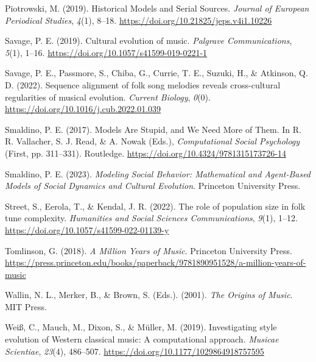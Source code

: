 \documentclass[
  a4paperpaper,
  ,captions=tableheading
]{scrbook}
\newlength{\cslhangindent}
\newlength{\cslentryspacingunit} %
\newenvironment{CSLReferences}[2] %
 {%
  \setlength{\parindent}{0pt}
  \ifodd #1
  \let\oldpar\par
  \def\par{\hangindent=\cslhangindent\oldpar}
  \fi
  \setlength{\parskip}{#2\cslentryspacingunit}
 }%
 {}
\begin{document}
\begin{CSLReferences}{1}{0}
\leavevmode{}%
Piotrowski, M. (2019). Historical {Models} and {Serial Sources}.
\emph{Journal of European Periodical Studies}, \emph{4}(1), 8--18.
\url{https://doi.org/10.21825/jeps.v4i1.10226}

\leavevmode{}%
Savage, P. E. (2019). Cultural evolution of music. \emph{Palgrave
Communications}, \emph{5}(1), 1--16.
\url{https://doi.org/10.1057/s41599-019-0221-1}

\leavevmode{}%
Savage, P. E., Passmore, S., Chiba, G., Currie, T. E., Suzuki, H., \&
Atkinson, Q. D. (2022). Sequence alignment of folk song melodies reveals
cross-cultural regularities of musical evolution. \emph{Current
Biology}, \emph{0}(0). \url{https://doi.org/10.1016/j.cub.2022.01.039}

\leavevmode{}%
Smaldino, P. E. (2017). Models {Are Stupid}, and {We Need More} of
{Them}. In R. R. Vallacher, S. J. Read, \& A. Nowak (Eds.),
\emph{Computational {Social Psychology}} (First, pp. 311--331).
{Routledge}. \url{https://doi.org/10.4324/9781315173726-14}

\leavevmode{}%
Smaldino, P. E. (2023). \emph{Modeling {Social Behavior}: {Mathematical}
and {Agent-Based Models} of {Social Dynamics} and {Cultural Evolution}}.
{Princeton University Press}.

\leavevmode{}%
Street, S., Eerola, T., \& Kendal, J. R. (2022). The role of population
size in folk tune complexity. \emph{Humanities and Social Sciences
Communications}, \emph{9}(1), 1--12.
\url{https://doi.org/10.1057/s41599-022-01139-y}

\leavevmode{}%
Tomlinson, G. (2018). \emph{A {Million Years} of {Music}}. {Princeton
University Press}.
\url{https://press.princeton.edu/books/paperback/9781890951528/a-million-years-of-music}

\leavevmode{}%
Wallin, N. L., Merker, B., \& Brown, S. (Eds.). (2001). \emph{The
{Origins} of {Music}}. {MIT Press}.

\leavevmode{}%
Weiß, C., Mauch, M., Dixon, S., \& Müller, M. (2019). Investigating
style evolution of {Western} classical music: {A} computational
approach. \emph{Musicae Scientiae}, \emph{23}(4), 486--507.
\url{https://doi.org/10.1177/1029864918757595}


\end{CSLReferences}
\end{document}
